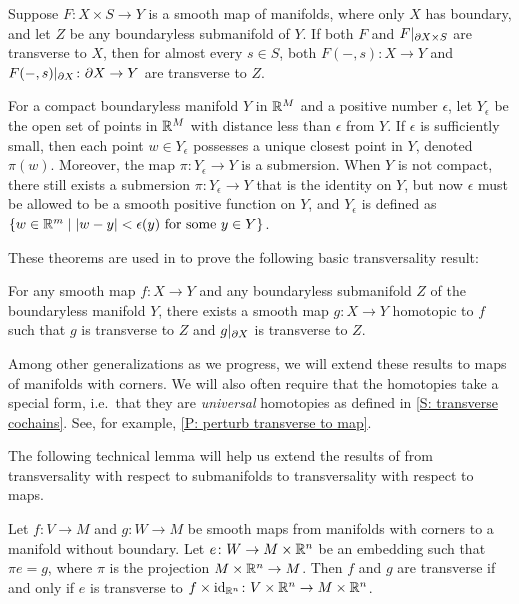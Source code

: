 \begin{theorem}
	Suppose $F \colon X \times S \to Y$ is a smooth map of manifolds, where only $X$ has boundary, and let $Z$ be any boundaryless submanifold of $Y$.
	If both $F$ and $F|_{\partial X \times S}$ are transverse to $X$, then for almost every $s \in S$, both $F(-,s) \colon X \to Y$ and $F(-,s)|_{\partial X} \colon \partial X \to Y$ are transverse to $Z$.
\end{theorem}

\begin{theorem}
	For a compact boundaryless manifold $Y$ in $\mathbb{R}^M$ and a positive number $\epsilon$, let $Y_\epsilon$ be the open set of points in $\mathbb{R}^M$ with distance less than $\epsilon$ from $Y$.
	If $\epsilon$ is sufficiently small, then each point $w \in Y_\epsilon$ possesses a unique closest point in $Y$, denoted $\pi(w)$.
	Moreover, the map $\pi \colon Y_\epsilon \to Y$ is a submersion.
	When $Y$ is not compact, there still exists a submersion $\pi \colon Y_\epsilon \to Y$ that is the identity on $Y$, but now $\epsilon$ must be allowed to be a smooth positive function on $Y$, and $Y_\epsilon$ is defined as $\{w \in \mathbb{R}^m \mid |w-y|<\epsilon(y) \text{\ for some\ } y \in Y\}$.
\end{theorem}

These theorems are used in \cite{GuPo74} to prove the following basic transversality result:

\begin{theorem}
	For any smooth map $f \colon X \to Y$ and any boundaryless submanifold $Z$ of the boundaryless manifold $Y$, there exists a smooth map $g \colon X \to Y$ homotopic to $f$ such that $g$ is transverse to $Z$ and $g|_{\partial X}$ is transverse to $Z$.
\end{theorem}

Among other generalizations as we progress, we will extend these results to maps of manifolds with corners.
We will also often require that the homotopies take a special form, i.e.\ that they are \textit{universal} homotopies as defined in \cref{S: transverse cochains}.
See, for example, \cref{P: perturb transverse to map}.

The following technical lemma will help us extend the results of \cite{GuPo74} from transversality with respect to submanifolds to transversality with respect to maps.

\begin{lemma}\label{L: all transversality is wrt embeddings}
	Let $f \colon V \to M$ and $g \colon W \to M$ be smooth maps from manifolds with corners to a manifold without boundary.
	Let $e \colon W \to M \times \mathbb{R}^n$ be an embedding such that $\pi e = g$, where $\pi$ is the projection $M \times \mathbb{R}^n \to M$.
	Then $f$ and $g$ are transverse if and only if $e$ is transverse to $f \times \mathrm{id}_{\mathbb{R}^n} \colon V \times \mathbb{R}^n \to M \times \mathbb{R}^n$.
\end{lemma}

